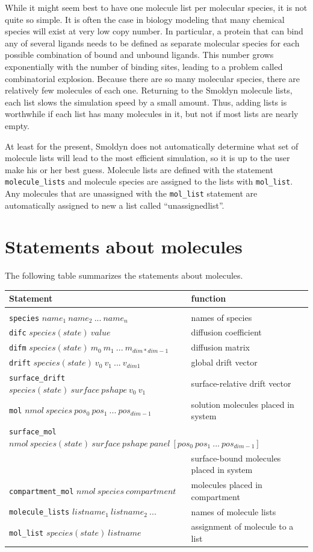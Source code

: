 \documentclass {book}
\newcommand {\ttt} {\texttt}
\begin{document}
While it might seem best to have one molecule list per molecular species, it is not quite so simple. It is often the case in biology modeling that many chemical species will exist at very low copy number. In particular, a protein that can bind any of several ligands needs to be defined as separate molecular species for each possible combination of bound and unbound ligands. This number grows exponentially with the number of binding sites, leading to a problem called combinatorial explosion. Because there are so many molecular species, there are relatively few molecules of each one. Returning to the Smoldyn molecule lists, each list slows the simulation speed by a small amount. Thus, adding lists is worthwhile if each list has many molecules in it, but not if most lists are nearly empty.

At least for the present, Smoldyn does not automatically determine what set of molecule lists will lead to the most efficient simulation, so it is up to the user make his or her best guess. Molecule lists are defined with the statement \ttt{molecule\_lists} and molecule species are assigned to the lists with \ttt{mol\_list}. Any molecules that are unassigned with the \ttt{mol\_list} statement are automatically assigned to new a list called ``unassignedlist''.

\section{Statements about molecules}

The following table summarizes the statements about molecules.

\begin{longtable}[c]{ll}
Statement & function\\
\hline \\
\ttt{species} $name_1\ name_2\ ...\ name_n$ & names of species\\
\ttt{difc} $species(state)\ value$ & diffusion coefficient\\
\ttt{difm} $species(state)\ m_0\ m_1\ ...\ m_{dim*dim-1}$ & diffusion matrix\\
\ttt{drift} $species(state)\ v_0\ v_1\ ...\ v_{dim1}$ & global drift vector\\
\ttt{surface\_drift} $species(state)\ surface\ pshape\ v_0\ v_1$ & surface-relative drift vector\\
\ttt{mol} $nmol\ species\ pos_0\ pos_1\ ...\ pos_{dim-1}$ & solution molecules placed in system\\
\multicolumn{2}{l}{
\ttt{surface\_mol} $nmol\ species(state)\ surface\ pshape\ panel\ [pos_0\ pos_1\ ...\ pos_{dim-1}]$}\\
 & surface-bound molecules placed in system\\
\ttt{compartment\_mol} $nmol\ species\ compartment$ & molecules placed in compartment\\
\ttt{molecule\_lists} $listname_1\ listname_2\ ...$ & names of molecule lists\\
\ttt{mol\_list} $species(state)\ listname$ & assignment of molecule to a list
\end{longtable}
\end{document}
